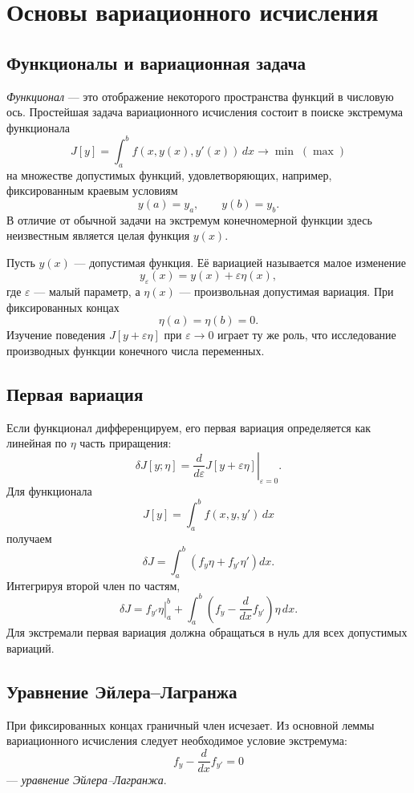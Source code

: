 \section{Основы вариационного исчисления}
\label{sec:calculus-of-variations}

\subsection{Функционалы и вариационная задача}

\emph{Функционал} --- это отображение некоторого пространства функций в
числовую ось. Простейшая задача вариационного исчисления состоит в поиске
экстремума функционала
\[
    J[y]=\int_a^b f(x,y(x),y'(x))\,dx\longrightarrow \min\;(\max)
\]
на множестве допустимых функций, удовлетворяющих, например, фиксированным
краевым условиям
\[
    y(a)=y_a,\qquad y(b)=y_b.
\]
В отличие от обычной задачи на экстремум конечномерной функции здесь
неизвестным является целая функция $y(x)$.

Пусть $y(x)$ --- допустимая функция. Её вариацией называется малое изменение
\[
    y_\varepsilon(x)=y(x)+\varepsilon\eta(x),
\]
где $\varepsilon$ --- малый параметр, а $\eta(x)$ --- произвольная допустимая
вариация. При фиксированных концах
\[
    \eta(a)=\eta(b)=0.
\]
Изучение поведения $J[y+\varepsilon\eta]$ при $\varepsilon\to0$ играет ту же
роль, что исследование производных функции конечного числа переменных.

\subsection{Первая вариация}

Если функционал дифференцируем, его первая вариация определяется как линейная
по $\eta$ часть приращения:
\[
    \delta J[y;\eta]
    =\left.\frac{d}{d\varepsilon}J[y+\varepsilon\eta]
      \right|_{\varepsilon=0}.
\]
Для функционала
\[
    J[y]=\int_a^b f(x,y,y')\,dx
\]
получаем
\[
    \delta J
    =\int_a^b\left(f_y\eta+f_{y'}\eta'\right)dx.
\]
Интегрируя второй член по частям,
\[
    \delta J=
    \left.f_{y'}\eta\right|_a^b+
    \int_a^b\left(f_y-\frac{d}{dx}f_{y'}\right)\eta\,dx.
\]
Для экстремали первая вариация должна обращаться в нуль для всех допустимых
вариаций.

\subsection{Уравнение Эйлера--Лагранжа}

При фиксированных концах граничный член исчезает. Из основной леммы
вариационного исчисления следует необходимое условие экстремума:
\[
    \boxed{\quad
    f_y-\frac{d}{dx}f_{y'}=0
    \quad}
\]
--- \emph{уравнение Эйлера--Лагранжа}.

